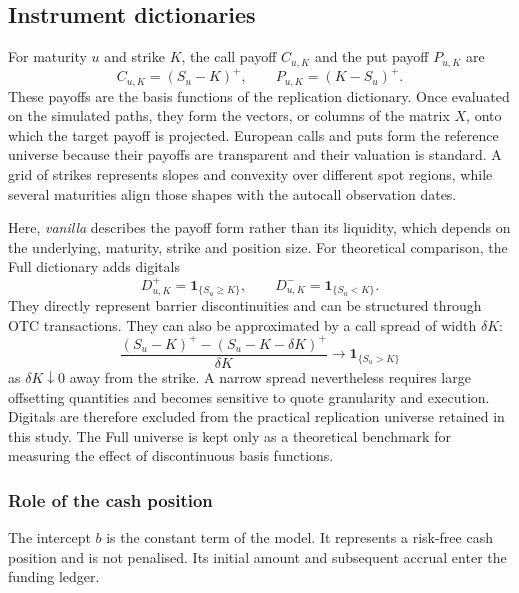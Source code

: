 \documentclass[12pt,a4paper]{article}
\newcommand{\1}{\mathbf{1}}
\begin{document}
\subsection{Instrument dictionaries}

For maturity $u$ and strike $K$, the call payoff $C_{u,K}$ and the put payoff
$P_{u,K}$ are
\begin{equation}
 C_{u,K}=(S_u-K)^+,\qquad P_{u,K}=(K-S_u)^+.
\label{eq:vanilla-payoffs}
\end{equation}
These payoffs are the basis functions of the replication dictionary. Once
evaluated on the simulated paths, they form the vectors, or columns of the
matrix $X$, onto which the target payoff is projected. European calls and puts
form the reference universe because their payoffs are transparent and their
valuation is standard. A grid of strikes represents slopes and convexity over
different spot regions, while several maturities align those shapes with the
autocall observation dates.

Here, \emph{vanilla} describes the payoff form rather than its liquidity, which
depends on the underlying, maturity, strike and position size. For theoretical
comparison, the Full dictionary adds digitals
\begin{equation}
 D^+_{u,K}=\1_{\{S_u\geq K\}},\qquad
 D^-_{u,K}=\1_{\{S_u<K\}}.
\label{eq:digital-payoffs}
\end{equation}
They directly represent barrier discontinuities and can be structured through
OTC transactions. They can also be approximated by a call spread of width
$\delta K$:
\begin{equation}
 \frac{(S_u-K)^+-(S_u-K-\delta K)^+}{\delta K}
 \longrightarrow \1_{\{S_u>K\}}
\label{eq:digital-call-spread}
\end{equation}
as $\delta K\downarrow0$ away from the strike. A narrow spread nevertheless
requires large offsetting quantities and becomes sensitive to quote granularity
and execution. Digitals are therefore excluded from the practical replication
universe retained in this study. The Full universe is kept only as a theoretical
benchmark for measuring the effect of discontinuous basis functions.

\subsubsection*{Role of the cash position}

The intercept $b$ is the constant term of the model. It represents a risk-free
cash position and is not penalised. Its initial amount and subsequent accrual
enter the funding ledger.
\end{document}
